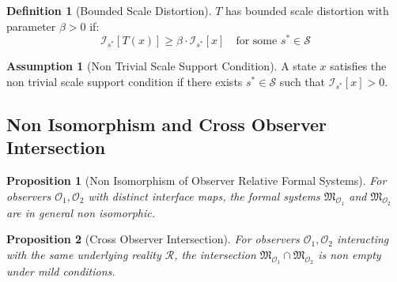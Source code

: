 \documentclass[12pt]{article}
\newtheorem{proposition}{Proposition}
\theoremstyle{definition}
\newtheorem{definition}{Definition}
\newtheorem{assumption}{Assumption}
\begin{document}
\begin{definition}[Bounded Scale Distortion]
$T$ has bounded scale distortion with parameter $\beta > 0$ if:
\begin{equation}
\mathcal{I}_{s^*}[T(x)] \geq \beta \cdot \mathcal{I}_{s^*}[x] \quad \text{for some } s^* \in \mathcal{S}
\end{equation}
\end{definition}

\begin{assumption}[Non Trivial Scale Support Condition]
A state $x$ satisfies the non trivial scale support condition if there exists $s^* \in \mathcal{S}$ such that $\mathcal{I}_{s^*}[x] > 0$.
\end{assumption}

\subsection{Non Isomorphism and Cross Observer Intersection}

\begin{proposition}[Non Isomorphism of Observer Relative Formal Systems]
For observers $\mathcal{O}_1, \mathcal{O}_2$ with distinct interface maps, the formal systems $\mathfrak{M}_{\mathcal{O}_1}$ and $\mathfrak{M}_{\mathcal{O}_2}$ are in general non isomorphic.
\end{proposition}

\begin{proposition}[Cross Observer Intersection]
For observers $\mathcal{O}_1, \mathcal{O}_2$ interacting with the same underlying reality $\mathcal{R}$, the intersection $\mathfrak{M}_{\mathcal{O}_1} \cap \mathfrak{M}_{\mathcal{O}_2}$ is non empty under mild conditions.
\end{proposition}
\end{document}
